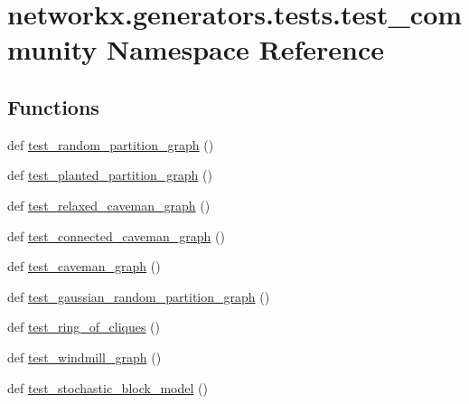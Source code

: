 \hypertarget{namespacenetworkx_1_1generators_1_1tests_1_1test__community}{}\section{networkx.\+generators.\+tests.\+test\+\_\+community Namespace Reference}
\label{namespacenetworkx_1_1generators_1_1tests_1_1test__community}
\subsection*{Functions}
\begin{DoxyCompactItemize}
\item 
def \hyperlink{namespacenetworkx_1_1generators_1_1tests_1_1test__community_a14f0d867d8da095ea67acbfef7305d16}{test\+\_\+random\+\_\+partition\+\_\+graph} ()
\item 
def \hyperlink{namespacenetworkx_1_1generators_1_1tests_1_1test__community_a818fa05aa2c2c4b4bd7e0f9092a20c5b}{test\+\_\+planted\+\_\+partition\+\_\+graph} ()
\item 
def \hyperlink{namespacenetworkx_1_1generators_1_1tests_1_1test__community_a1c6908649c9fa880ce4584f1d7cca2f3}{test\+\_\+relaxed\+\_\+caveman\+\_\+graph} ()
\item 
def \hyperlink{namespacenetworkx_1_1generators_1_1tests_1_1test__community_a51af007566b17d22d2e59ceb45460817}{test\+\_\+connected\+\_\+caveman\+\_\+graph} ()
\item 
def \hyperlink{namespacenetworkx_1_1generators_1_1tests_1_1test__community_a174da9ff331abe771dfd89b6cc87d8be}{test\+\_\+caveman\+\_\+graph} ()
\item 
def \hyperlink{namespacenetworkx_1_1generators_1_1tests_1_1test__community_a2ee13e79a871eaed5556ecb402125857}{test\+\_\+gaussian\+\_\+random\+\_\+partition\+\_\+graph} ()
\item 
def \hyperlink{namespacenetworkx_1_1generators_1_1tests_1_1test__community_ad3576076e6d79530dd5ca1a6684da597}{test\+\_\+ring\+\_\+of\+\_\+cliques} ()
\item 
def \hyperlink{namespacenetworkx_1_1generators_1_1tests_1_1test__community_adfe91873de08e72e15c40eeba20adabc}{test\+\_\+windmill\+\_\+graph} ()
\item 
def \hyperlink{namespacenetworkx_1_1generators_1_1tests_1_1test__community_a8d680c607ed8fb228c3b0dbeba04b833}{test\+\_\+stochastic\+\_\+block\+\_\+model} ()
\item 

\end{DoxyCompactItemize}
